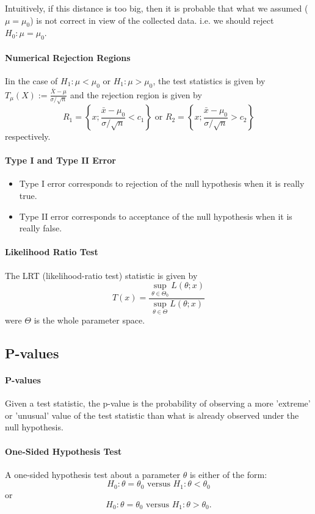 Intuitively, if this distance is too big, then it is probable that what we assumed (\(\mu = \mu_0\)) is not correct in view of the collected data. i.e. we should reject \(H_0: \mu = \mu_0\).

\paragraph{Numerical Rejection Regions}
Iin the case of \(H_1 : \mu < \mu_0\) or \(H_1: \mu > \mu_0\), the test statistics is given by \(T_\mu(X) := \frac{\bar{X} - \mu}{\sigma / \sqrt{n}}\) and the rejection region is given by
\[R_1 = \left\{ x; \frac{\bar{x} - \mu_0}{\sigma / \sqrt{n}} <c_1 \right\} \text{ or } R_2 = \left\{x; \frac{\bar{x} - \mu_0}{\sigma / \sqrt{n}} > c_2\right\}\]
respectively.

\paragraph{Type I and Type II Error}
\begin{itemize}
    \item Type I error corresponds to rejection of the null hypothesis when it is really true.
    \item Type II error corresponds to acceptance of the null hypothesis when it is really false.
\end{itemize}

\paragraph{Likelihood Ratio Test}
The LRT (likelihood-ratio test) statistic is given by
\[T(x) = \frac{\sup_{\theta \in \Theta_0} L(\theta; x)}{\sup_{\theta \in \Theta} L(\theta; x)}\]
were \(\Theta\) is the whole parameter space.

\subsection{P-values}
\paragraph{P-values}
Given a test statistic, the p-value is the probability of observing a more 'extreme' or 'unusual' value of the test statistic than what is already observed under the null hypothesis.

\paragraph{One-Sided Hypothesis Test}
A one-sided hypothesis test about a parameter \(\theta\) is either of the form:
\[H_0: \theta = \theta_0 \text{ versus } H_1: \theta < \theta_0\]
or
\[H_0: \theta = \theta_0 \text{ versus } H_1: \theta > \theta_0.\]

